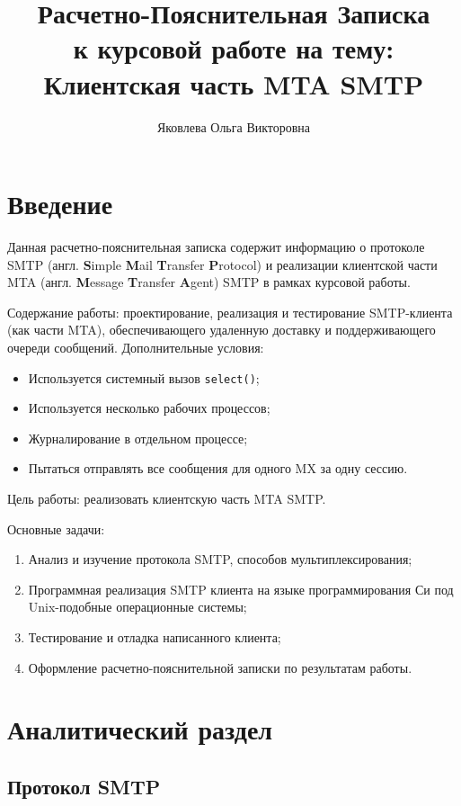 \documentclass[a4paper,12pt]{report}
\title{Расчетно-Пояснительная Записка \\ 
    \large к курсовой работе на тему: \\ Клиентская часть MTA SMTP}
\author{Яковлева Ольга Викторовна}
\begin{document}
\maketitle


\tableofcontents

\clearpage
\chapter*{Введение}

Данная расчетно-пояснительная записка содержит информацию о протоколе SMTP (англ. \textbf{S}imple \textbf{M}ail \textbf{T}ransfer \textbf{P}rotocol) и реализации клиентской части MTA (англ. \textbf{M}essage \textbf{T}ransfer \textbf{A}gent) SMTP в рамках курсовой работы.

Содержание работы: проектирование, реализация и тестирование SMTP-клиента (как части MTA), обеспечивающего удаленную доставку и поддерживающего очереди сообщений. Дополнительные условия:
\begin{itemize}
\item Используется системный вызов \texttt{select()};
\item Используется несколько рабочих процессов;
\item Журналирование в отдельном процессе;
\item Пытаться отправлять все сообщения для одного MX за одну сессию.
\end{itemize}

Цель работы: реализовать клиентскую часть MTA SMTP.

Основные задачи:
\begin{enumerate}
    \item Анализ и изучение протокола SMTP, способов мультиплексирования;
    \item Программная реализация SMTP клиента на языке программирования Си под Unix-подобные операционные системы;
    \item Тестирование и отладка написанного клиента;
    \item Оформление расчетно-пояснительной записки по результатам работы.
\end{enumerate}


\chapter{Аналитический раздел}


\section{Протокол SMTP}
\end{document}
